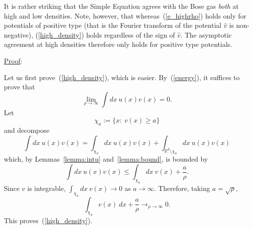 \documentclass{ian}
\begin{document}
It is rather striking that the Simple Equation agrees with the Bose gas {\it both} at high and low densities.
Note, however, that whereas\-~(\ref{e_highrho}) holds only for potentials of positive type (that is the Fourier transform of the potential $\hat v$ is non-negative), (\ref{high_density}) holds regardless of the sign of $\hat v$.
The asymptotic agreement at high densities therefore only holds for positive type potentials.
\bigskip

\indent\underline{Proof}:
\medskip

  \point
  Let us first prove\-~(\ref{high_density}), which is easier.
  By\-~(\ref{energy}), it suffices to prove that
  \begin{equation}
    \lim_{\rho\to\infty}\int dx\ u(x)v(x)
    =0
    .
    \label{limintuv}
  \end{equation}
  Let
  \begin{equation}
    \chi_a:=\{x:\ v(x)\geqslant a\}
  \end{equation}
  and decompose
  \begin{equation}
    \int dx\ u(x)v(x)
    =
    \int_{\chi_a}dx\ u(x)v(x)
    +
    \int_{\mathbb R^d\setminus\chi_a}dx\ u(x)v(x)
  \end{equation}
  which, by Lemmas\-~\ref{lemma:intu} and\-~\ref{lemma:bound}, is bounded by
  \begin{equation}
    \int dx\ u(x)v(x)
    \leqslant
    \int_{\chi_a}dx\ v(x)
    +
    \frac a\rho
    .
  \end{equation}
  Since $v$ is integrable, $\int_{\chi_a}dx\ v(x)\to0$ as $a\to\infty$.
  Therefore, taking $a=\sqrt{\rho}$,
  \begin{equation}
    \int_{\chi_a}v(x)\ dx
    +
    \frac a\rho
    \mathop{\longrightarrow}_{\rho\to\infty}0
    .
  \end{equation}
  This proves\-~(\ref{high_density}).
  \bigskip
\end{document}
